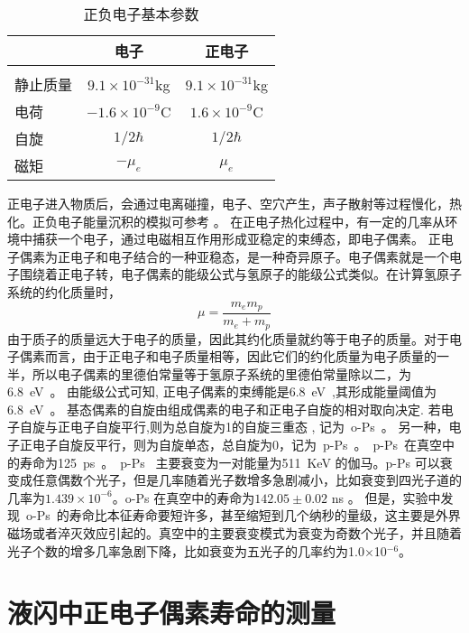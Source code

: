 \begin{table}[htb]
\centering  %
\begin{tabular}{lcc}  %
\hline
&电子&正电子 \\ \hline  %
\\ 静止质量&$9.1\times10^{-31}$kg& $9.1\times10^{-31}$kg       %
\\  电荷&$-1.6\times10^{-9}$C& $1.6\times10^{-9}$C    %
\\自旋&$1/2\hbar$&$1/2\hbar$
\\磁矩&$-\mu_{e}$&$\mu_{e}$
\\ \hline
\end{tabular}
\caption{正负电子基本参数}
\end{table}
正电子进入物质后，会通过电离碰撞，电子、空穴产生，声子散射等过程慢化，热化。正负电子能量沉积的模拟可参考
\citep{baro1995penelope}。 在正电子热化过程中，有一定的几率从环境中捕获一个电子，通过电磁相互作用形成亚稳定的束缚态，即电子偶素。
正电子偶素为正电子和电子结合的一种亚稳态，是一种奇异原子。电子偶素就是一个电子围绕着正电子转，电子偶素的能级公式与氢原子的能级公式类似。在计算氢原子系统的约化质量时，
$$\mu = \frac{m_em_p}{m_e+m_p}$$
由于质子的质量远大于电子的质量，因此其约化质量就约等于电子的质量。对于电子偶素而言，由于正电子和电子质量相等，因此它们的约化质量为电子质量的一半，所以电子偶素的里德伯常量等于氢原子系统的里德伯常量除以二，为6.8~eV~。 由能级公式可知, 正电子偶素的束缚能是6.8~eV~,其形成能量阈值为6.8~eV~。
基态偶素的自旋由组成偶素的电子和正电子自旋的相对取向决定. 若电子自旋与正电子自旋平行,则为总自旋为1的自旋三重态 , 记为~o-Ps~。 另一种，电子正电子自旋反平行，则为自旋单态，总自旋为0，记为~p-Ps~。~p-Ps~在真空中的寿命为125~ps~\citep{karshenboim2004precision}。~p-Ps~ 主要衰变为一对能量为511~KeV 的伽马。p-Ps 可以衰变成任意偶数个光子，但是几率随着光子数增多急剧减小，比如衰变到四光子道的几率为$1.439\times10^{-6}$。o-Ps 在真空中的寿命为$142.05\pm0.02$ ns \citep{badertscher2007improved}。 但是，实验中发现~o-Ps~的寿命比本征寿命要短许多，甚至缩短到几个纳秒的量级，这主要是外界磁场或者淬灭效应引起的。真空中的主要衰变模式为衰变为奇数个光子，并且随着光子个数的增多几率急剧下降，比如衰变为五光子的几率约为1.0$\times$10$^{-6}$。

 \section{液闪中正电子偶素寿命的测量}
